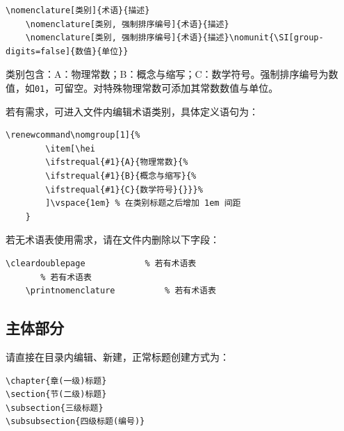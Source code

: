 \begin{lstlisting}[language={[LaTeX]TeX}]
    \nomenclature[类别]{术语}{描述}
    \nomenclature[类别, 强制排序编号]{术语}{描述}
    \nomenclature[类别, 强制排序编号]{术语}{描述}\nomunit{\SI[group-digits=false]{数值}{单位}}
\end{lstlisting}

类别包含：A：物理常数；B：概念与缩写；C：数学符号。强制排序编号为数值，如\texttt{01}，可留空。对特殊物理常数可添加其常数数值与单位。

若有需求，可进入文件内编辑术语类别，具体定义语句为：
\begin{lstlisting}[language={[LaTeX]TeX}]
    \renewcommand\nomgroup[1]{%
        \item[\hei
        \ifstrequal{#1}{A}{物理常数}{%
        \ifstrequal{#1}{B}{概念与缩写}{%
        \ifstrequal{#1}{C}{数学符号}{}}}%
        ]\vspace{1em} % 在类别标题之后增加 1em 间距
    }
\end{lstlisting}

若无术语表使用需求，请在文件内删除以下字段：

\begin{lstlisting}[language={[LaTeX]TeX}]
    \cleardoublepage            % 若有术语表
       % 若有术语表
    \printnomenclature          % 若有术语表
\end{lstlisting}

\subsection{主体部分}
请直接在目录内编辑、新建，正常标题创建方式为：
\begin{lstlisting}[language={[LaTeX]TeX}]
\chapter{章(一级)标题}
\section{节(二级)标题}
\subsection{三级标题}
\subsubsection{四级标题(编号)}
\end{lstlisting}

